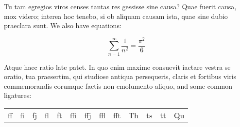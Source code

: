 Tu tam egregios viros censes tantas res gessisse sine causa? Quae fuerit causa, mox videro; interea hoc tenebo, si ob aliquam causam ista, quae sine dubio praeclara sunt. We also have equations:

\begin{equation}
  \sum_{n=1}^\infty \dfrac{1}{n^2}=\dfrac{\pi^2}{6}
\end{equation}

Atque haec ratio late patet. In quo enim maxime consuevit iactare vestra se oratio, tua praesertim, qui studiose antiqua persequeris, claris et fortibus viris commemorandis eorumque factis non emolumento aliquo, and some common ligatures:

\begin{tabular}{ccccccccccccc}
  ff & fi & fj & fl & ft & ffi & ffj & ffl & fft & Th & ts & tt & Qu
\end{tabular}

